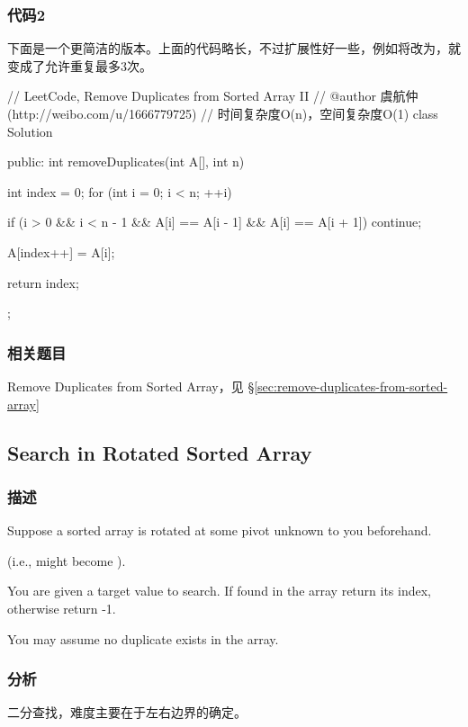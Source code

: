 \subsubsection{代码2}
下面是一个更简洁的版本。上面的代码略长，不过扩展性好一些，例如将改为，就变成了允许重复最多3次。
\begin{Code}
// LeetCode, Remove Duplicates from Sorted Array II
// @author 虞航仲 (http://weibo.com/u/1666779725)
// 时间复杂度O(n)，空间复杂度O(1)
class Solution {
public:
    int removeDuplicates(int A[], int n) {
        int index = 0;
        for (int i = 0; i < n; ++i) {
            if (i > 0 && i < n - 1 && A[i] == A[i - 1] && A[i] == A[i + 1])
                continue;

            A[index++] = A[i];
        }
        return index;
    }
};
\end{Code}


\subsubsection{相关题目}

\begindot
\item Remove Duplicates from Sorted Array，见 \S \ref{sec:remove-duplicates-from-sorted-array}
\myenddot


\subsection{Search in Rotated Sorted Array}
\label{sec:search-in-rotated-sorted-array}


\subsubsection{描述}
Suppose a sorted array is rotated at some pivot unknown to you beforehand.

(i.e.,  might become ).

You are given a target value to search. If found in the array return its index, otherwise return -1.

You may assume no duplicate exists in the array.


\subsubsection{分析}
二分查找，难度主要在于左右边界的确定。



